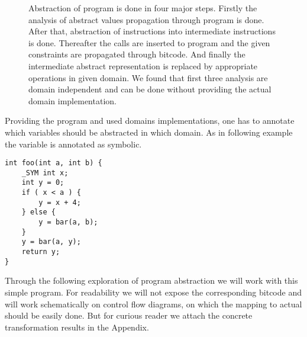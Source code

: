 \begin{figure}[!ht]


\caption{Abstraction of program is done in four major steps. Firstly the
analysis of abstract values propagation through program is done. After that,
abstraction of instructions into intermediate \LART instructions is done.
Thereafter the  calls are inserted to program and the given
constraints are propagated through bitcode. And finally the intermediate
abstract representation is replaced by appropriate operations in given domain.
We found that first three analysis are domain independent and can be done
without providing the actual domain implementation.
}
\label{fig:transformation}
\end{figure}


Providing the program and used domains implementations, one has
to annotate which variables should be abstracted in which domain. As in
following example the variable  is annotated as symbolic.
\begin{verbatim}
int foo(int a, int b) {
    _SYM int x;
    int y = 0;
    if ( x < a ) {
        y = x + 4;
    } else {
        y = bar(a, b);
    }
    y = bar(a, y);
    return y;
}
\end{verbatim}
Through the following exploration of program abstraction we will work with this
simple \Cpp{} program. For readability we will not expose the corresponding \LLVM
bitcode and will work schematically on control flow diagrams, on which the
mapping to actual \LLVM should be easily done. But for curious reader we attach the
concrete \LLVM transformation results in the Appendix.

